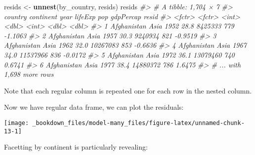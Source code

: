 \documentclass[]{book}
\newenvironment{Shaded}{\begin{snugshade}}{\end{snugshade}}
\newcommand{\KeywordTok}[1]{\textcolor[rgb]{0.13,0.29,0.53}{\textbf{{#1}}}}
\newcommand{\DataTypeTok}[1]{\textcolor[rgb]{0.13,0.29,0.53}{{#1}}}
\newcommand{\DecValTok}[1]{\textcolor[rgb]{0.00,0.00,0.81}{{#1}}}
\newcommand{\StringTok}[1]{\textcolor[rgb]{0.31,0.60,0.02}{{#1}}}
\newcommand{\CommentTok}[1]{\textcolor[rgb]{0.56,0.35,0.01}{\textit{{#1}}}}
\newcommand{\OtherTok}[1]{\textcolor[rgb]{0.56,0.35,0.01}{{#1}}}
\newcommand{\NormalTok}[1]{{#1}}
\begin{document}
\begin{Shaded}
\begin{Highlighting}[]
\NormalTok{resids <-}\StringTok{ }\KeywordTok{unnest}\NormalTok{(by_country, resids)}
\NormalTok{resids}
\CommentTok{#> # A tibble: 1,704 × 7}
\CommentTok{#>       country continent  year lifeExp      pop gdpPercap   resid}
\CommentTok{#>        <fctr>    <fctr> <int>   <dbl>    <int>     <dbl>   <dbl>}
\CommentTok{#> 1 Afghanistan      Asia  1952    28.8  8425333       779 -1.1063}
\CommentTok{#> 2 Afghanistan      Asia  1957    30.3  9240934       821 -0.9519}
\CommentTok{#> 3 Afghanistan      Asia  1962    32.0 10267083       853 -0.6636}
\CommentTok{#> 4 Afghanistan      Asia  1967    34.0 11537966       836 -0.0172}
\CommentTok{#> 5 Afghanistan      Asia  1972    36.1 13079460       740  0.6741}
\CommentTok{#> 6 Afghanistan      Asia  1977    38.4 14880372       786  1.6475}
\CommentTok{#> # ... with 1,698 more rows}
\end{Highlighting}
\end{Shaded}

Note that each regular column is repeated one for each row in the nested
column.

Now we have regular data frame, we can plot the residuals:

\begin{Shaded}
\end{Shaded}

\begin{center}\texttt{[image: \_bookdown\_files/model-many\_files/figure-latex/unnamed-chunk-13-1]} \end{center}

Facetting by continent is particularly revealing:

\begin{Shaded}
\end{Shaded}
\end{document}
